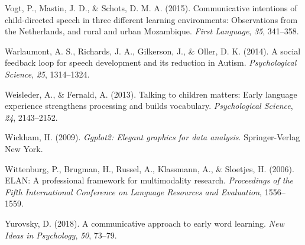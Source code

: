 \documentclass[,man,floatsintext]{apa6}
\begin{document}
\hypertarget{ref-vogt2015communicative}{}
Vogt, P., Mastin, J. D., \& Schots, D. M. A. (2015). Communicative
intentions of child-directed speech in three different learning
environments: Observations from the Netherlands, and rural and urban
Mozambique. \emph{First Language}, \emph{35}, 341--358.

\hypertarget{ref-warlaumont2014social}{}
Warlaumont, A. S., Richards, J. A., Gilkerson, J., \& Oller, D. K.
(2014). A social feedback loop for speech development and its reduction
in Autism. \emph{Psychological Science}, \emph{25}, 1314--1324.

\hypertarget{ref-weisleder2013talking}{}
Weisleder, A., \& Fernald, A. (2013). Talking to children matters: Early
language experience strengthens processing and builds vocabulary.
\emph{Psychological Science}, \emph{24}, 2143--2152.

\hypertarget{ref-R-ggplot2}{}
Wickham, H. (2009). \emph{Ggplot2: Elegant graphics for data analysis}.
Springer-Verlag New York.

\hypertarget{ref-ELAN}{}
Wittenburg, P., Brugman, H., Russel, A., Klassmann, A., \& Sloetjes, H.
(2006). ELAN: A professional framework for multimodality research.
\emph{Proceedings of the Fifth International Conference on Language
Resources and Evaluation}, 1556--1559.

\hypertarget{ref-yurovsky2018communicative}{}
Yurovsky, D. (2018). A communicative approach to early word learning.
\emph{New Ideas in Psychology}, \emph{50}, 73--79.

\endgroup
\end{document}
